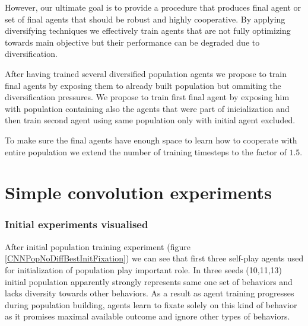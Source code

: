 However, our ultimate goal is to provide a procedure that produces final agent or set of final agents that should be robust and highly cooperative.
By applying diversifying techniques we effectively train agents that are not fully optimizing towards main objective but their performance can be degraded due to diversification. 

After having trained several diversified population agents we propose to train final agents by exposing them to already built population but ommiting the diversification pressures.
We propose to train first final agent by exposing him with population containing also the agents that were part of inicialization
and then train second agent using same population only with initial agent excluded.

To make sure the final agents have enough space to learn how to cooperate with entire population we extend the number of training timesteps to the factor of $1.5$.


\section{Simple convolution experiments}

\subsubsection{Initial experiments visualised}

After initial population training experiment (figure \ref{CNNPopNoDiffBestInitFixation}) we can see that first three self-play agents used for initialization of population play important role.
In three seeds (10,11,13) initial population apparently strongly represents same one set of behaviors and lacks diversity towards other behaviors.
As a result as agent training progresses during population building, agents learn to fixate solely on this kind of behavior as it promises maximal available outcome and ignore other types of behaviors.

